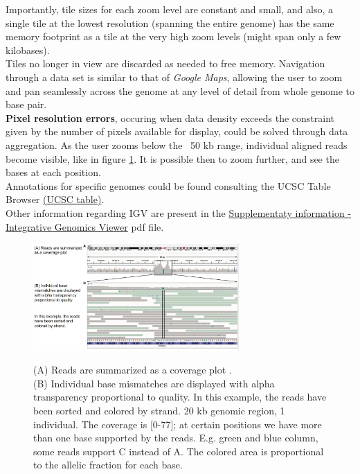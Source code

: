 Importantly, tile sizes for each zoom level are constant and small, and
also, a single tile at the lowest resolution (spanning the entire genome) has
the same memory footprint as a tile at the very high zoom levels (might span
only a few kilobases). \\
Tiles no longer in view are discarded as needed to free memory. Navigation
through a data set is similar to that of \textit{Google Maps}, allowing the user
to zoom and pan seamlessly across the genome at any level of detail from whole
genome to base pair.\\

\textbf{Pixel resolution errors}, occuring when data density exceeds the
constraint given by the number of pixels available for display, could be solved
through data aggregation. As the user zooms below the ~50 kb range, individual
aligned reads become visible, like in figure \ref{fig:ViewReads}. It is possible then to zoom further, and see the
bases at each position.\\

Annotations for specific genomes could be found consulting the UCSC Table
Browser \href{http://genome.ucsc.edu/cgi-bin/hgTables}{(UCSC table)}.\\

Other information regarding IGV are present in the
\href{https://authors.library.caltech.edu/72234/2/nbt.1754-S1.pdf}{Supplementaty
information - Integrative Genomics Viewer} pdf file.

\begin{figure}[H]
    \centering
    \includegraphics[width=0.7\textwidth]{IGVReadsView.PNG}
    \label{fig:ViewReads}
    \caption{(A) Reads are summarized as a coverage plot .\\
(B) Individual base mismatches are displayed with alpha transparency proportional to quality. In this example, the reads have been sorted and colored by strand. 20 kb genomic region, 1 individual. The coverage is [0-77]; at certain positions we have more than one base supported by the reads. E.g. green and blue column, some reads support C instead of A. The colored area is proportional to the allelic fraction for each base.
}
\end{figure}


